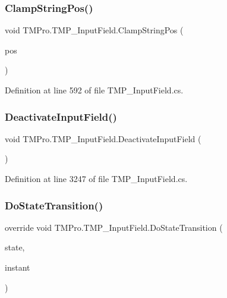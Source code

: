 \subsubsection{\texorpdfstring{ClampStringPos()}{ClampStringPos()}}
{\footnotesize\ttfamily void T\+M\+Pro.\+T\+M\+P\+\_\+\+Input\+Field.\+Clamp\+String\+Pos (\begin{DoxyParamCaption}\item[{ref int}]{pos }\end{DoxyParamCaption})\hspace{0.3cm}{\ttfamily [protected]}}



Definition at line 592 of file T\+M\+P\+\_\+\+Input\+Field.\+cs.

\mbox{\label{class_t_m_pro_1_1_t_m_p___input_field_a51726d0c870d54e1235c3b7d9c6a2425}} 
\subsubsection{\texorpdfstring{DeactivateInputField()}{DeactivateInputField()}}
{\footnotesize\ttfamily void T\+M\+Pro.\+T\+M\+P\+\_\+\+Input\+Field.\+Deactivate\+Input\+Field (\begin{DoxyParamCaption}{ }\end{DoxyParamCaption})}



Definition at line 3247 of file T\+M\+P\+\_\+\+Input\+Field.\+cs.

\mbox{\label{class_t_m_pro_1_1_t_m_p___input_field_af860afd96be9a72782c9b4c7ce91f5e6}} 
\subsubsection{\texorpdfstring{DoStateTransition()}{DoStateTransition()}}
{\footnotesize\ttfamily override void T\+M\+Pro.\+T\+M\+P\+\_\+\+Input\+Field.\+Do\+State\+Transition (\begin{DoxyParamCaption}\item[{Selection\+State}]{state,  }\item[{bool}]{instant }\end{DoxyParamCaption})\hspace{0.3cm}{\ttfamily [protected]}}



